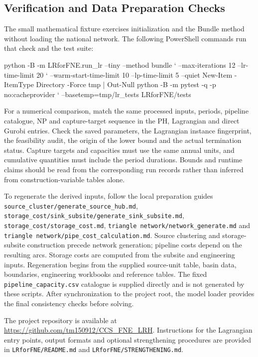 \documentclass[11pt,letterpaper]{article}
\newcommand{\file}[1]{\texttt{\small\nolinkurl{#1}}}
\begin{document}
\subsection{Verification and Data Preparation Checks}

The small mathematical fixture exercises initialization and the Bundle method without loading the national network. The following PowerShell commands run that check and the test suite:

\begin{commands}
python -B -m LRforFNE.run_lr --tiny --method bundle `
  --max-iterations 12 --lr-time-limit 20 `
  --warm-start-time-limit 10 --lp-time-limit 5 --quiet
New-Item -ItemType Directory -Force tmp | Out-Null
python -B -m pytest -q -p no:cacheprovider `
  --basetemp=tmp/lr_tests LRforFNE/tests
\end{commands}

For a numerical comparison, match the same processed inputs, periods, pipeline catalogue, NP and capture-target sequence in the PH, Lagrangian and direct Gurobi entries. Check the saved parameters, the Lagrangian instance fingerprint, the feasibility audit, the origin of the lower bound and the actual termination status. Capture targets and capacities must use the same annual units, and cumulative quantities must include the period durations. Bounds and runtime claims should be read from the corresponding run records rather than inferred from construction-variable tables alone.

To regenerate the derived inputs, follow the local preparation guides \file{source_cluster/generate_source_hub.md}, \file{storage_cost/sink_subsite/generate_sink_subsite.md}, \file{storage_cost/storage_cost.md}, \file{triangle network/network_generate.md} and \file{triangle network/pipe_cost_calculation.md}. Source clustering and storage-subsite construction precede network generation; pipeline costs depend on the resulting arcs. Storage costs are computed from the subsite and engineering inputs. Regeneration begins from the supplied source-unit table, basin data, boundaries, engineering workbooks and reference tables. The fixed \file{pipeline_capacity.csv} catalogue is supplied directly and is not generated by these scripts. After synchronization to the project root, the model loader provides the final consistency checks before solving.

The project repository is available at \url{https://github.com/tm150912/CCS_FNE_LRH}. Instructions for the Lagrangian entry points, output formats and optional strengthening procedures are provided in \file{LRforFNE/README.md} and \file{LRforFNE/STRENGTHENING.md}.
\end{document}
